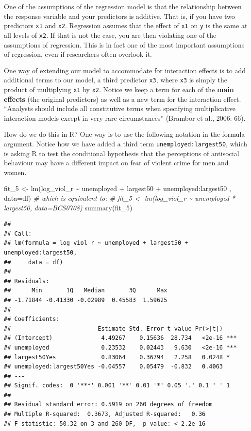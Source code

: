 \documentclass[
]{book}
\newenvironment{Shaded}{\begin{snugshade}}{\end{snugshade}}
\newcommand{\AttributeTok}[1]{\textcolor[rgb]{0.77,0.63,0.00}{#1}}
\newcommand{\CommentTok}[1]{\textcolor[rgb]{0.56,0.35,0.01}{\textit{#1}}}
\newcommand{\FunctionTok}[1]{\textcolor[rgb]{0.00,0.00,0.00}{#1}}
\newcommand{\NormalTok}[1]{#1}
\newcommand{\OtherTok}[1]{\textcolor[rgb]{0.56,0.35,0.01}{#1}}
\newcommand{\SpecialCharTok}[1]{\textcolor[rgb]{0.00,0.00,0.00}{#1}}
\begin{document}
One of the assumptions of the regression model is that the relationship between the response variable and your predictors is additive. That is, if you have two predictors \texttt{x1} and \texttt{x2}. Regression assumes that the effect of \texttt{x1} on \texttt{y} is the same at all levels of \texttt{x2}. If that is not the case, you are then violating one of the assumptions of regression. This is in fact one of the most important assumptions of regression, even if researchers often overlook it.

One way of extending our model to accommodate for interaction effects is to add additional terms to our model, a third predictor \texttt{x3}, where \texttt{x3} is simply the product of multiplying \texttt{x1} by \texttt{x2}. Notice we keep a term for each of the \textbf{main effects} (the original predictors) as well as a new term for the interaction effect. ``Analysts should include all constitutive terms when specifying multiplicative interaction models except in very rare circumstances'' (Brambor et al., 2006: 66).

How do we do this in R? One way is to use the following notation in the formula argument. Notice how we have added a third term \texttt{unemployed:largest50}, which is asking R to test the conditional hypothesis that the perceptions of antisocial behaviour may have a different impact on fear of violent crime for men and women.

\begin{Shaded}
\begin{Highlighting}[]
\NormalTok{fit\_5 }\OtherTok{\textless{}{-}} \FunctionTok{lm}\NormalTok{(log\_viol\_r }\SpecialCharTok{\textasciitilde{}}\NormalTok{ unemployed }\SpecialCharTok{+}\NormalTok{ largest50 }\SpecialCharTok{+}\NormalTok{ unemployed}\SpecialCharTok{:}\NormalTok{largest50 , }\AttributeTok{data=}\NormalTok{df)}
\CommentTok{\# which is equivalent to: }
\CommentTok{\# fit\_5 \textless{}{-} lm(log\_viol\_r \textasciitilde{} unemployed * largest50, data=BCS0708)}
\FunctionTok{summary}\NormalTok{(fit\_5)}
\end{Highlighting}
\end{Shaded}

\begin{verbatim}
## 
## Call:
## lm(formula = log_viol_r ~ unemployed + largest50 + unemployed:largest50, 
##     data = df)
## 
## Residuals:
##      Min       1Q   Median       3Q      Max 
## -1.71844 -0.41330 -0.02989  0.45583  1.59625 
## 
## Coefficients:
##                         Estimate Std. Error t value Pr(>|t|)    
## (Intercept)              4.49267    0.15636  28.734   <2e-16 ***
## unemployed               0.23532    0.02443   9.630   <2e-16 ***
## largest50Yes             0.83064    0.36794   2.258   0.0248 *  
## unemployed:largest50Yes -0.04557    0.05479  -0.832   0.4063    
## ---
## Signif. codes:  0 '***' 0.001 '**' 0.01 '*' 0.05 '.' 0.1 ' ' 1
## 
## Residual standard error: 0.5919 on 260 degrees of freedom
## Multiple R-squared:  0.3673, Adjusted R-squared:   0.36 
## F-statistic: 50.32 on 3 and 260 DF,  p-value: < 2.2e-16
\end{verbatim}
\end{document}
